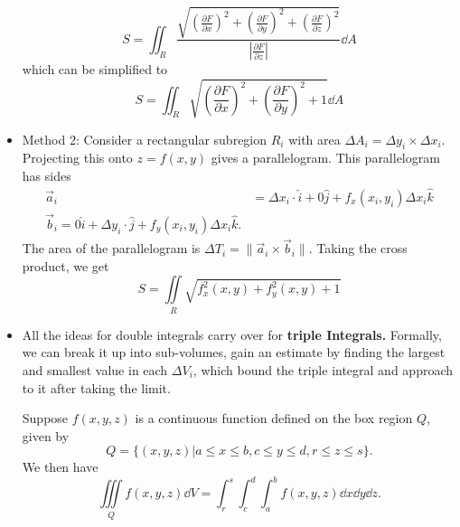 \begin{itemize}
          \begin{equation}
              S = \iint_R \frac{\sqrt{\left(\frac{\partial F}{\partial x}\right)^2+\left(\frac{\partial F}{\partial y}\right)^2+\left(\frac{\partial F}{\partial z}\right)^2}}{\left|\frac{\partial F}{\partial z}\right|}\dd{A}
          \end{equation}
          which can be simplified to
          \begin{equation}
              \boxed{S = \iint_R \sqrt{\left(\frac{\partial F}{\partial x}\right)^2+\left(\frac{\partial F}{\partial y}\right)^2+1}\dd{A}}
          \end{equation}
    \item Method 2: Consider a rectangular subregion $R_i$ with area $\Delta A_i = \Delta y_i \times \Delta x_i$. Projecting this onto $z=f(x,y)$ gives a parallelogram. This parallelogram has sides
          \begin{align}
              \vec{a}_i & = \Delta x_i \cdot \hat{i} + 0\hat{j} + f_x(x_i,y_i)\Delta x_i \hat{k} \\
              \vec{b}_i = 0\hat{i} + \Delta y_i \cdot \hat{j} + f_y(x_i,y_i)\Delta x_i \hat{k}.
          \end{align}
          The area of the parallelogram is $\Delta T_i = \lVert \vec{a}_i \times \vec{b}_i \rVert.$ Taking the cross product, we get
          \begin{equation}
              \boxed{S=\iint\limits_R\sqrt{f_x^2(x,y)+f_y^2(x,y)+1}}
          \end{equation}
    \item All the ideas for double integrals carry over for \textbf{triple Integrals.} Formally, we can break it up into sub-volumes, gain an estimate by finding the largest and smallest value in each $\Delta V_i$, which bound the triple integral and approach to it after taking the limit.
          \begin{example}
              Suppose $f(x,y,z)$ is a continuous function defined on the box region $Q$, given by
              \begin{equation}
                  Q = \{(x,y,z)|a\le x\le b, c\le y\le d, r\le z\le s\}.
              \end{equation}
              We then have
              \begin{equation}
                  \iiint\limits_Q f(x,y,z)\dd{V} = \int_r^s\int_c^d\int_a^b f(x,y,z) \dd{x}\dd{y}\dd{z}.
              \end{equation}
          \end{example}

\end{itemize}
